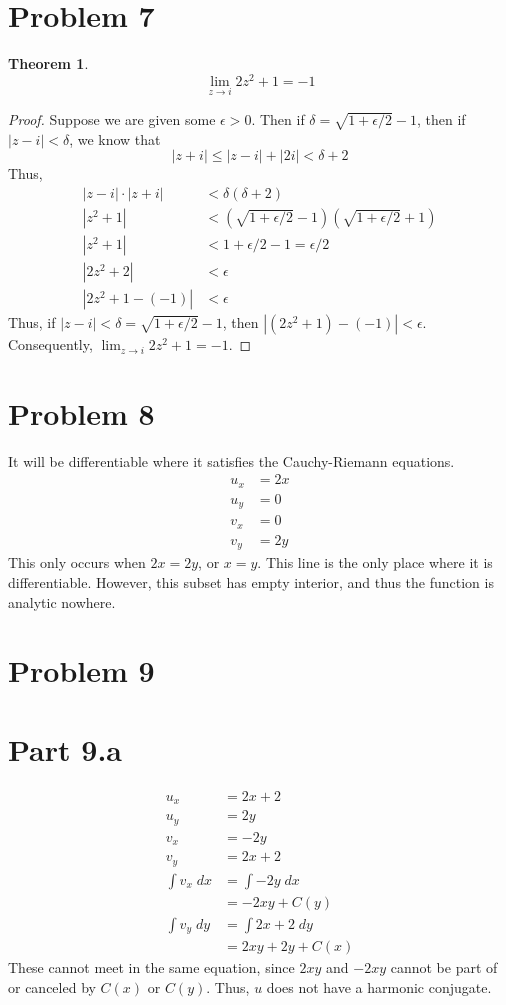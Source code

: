 \documentclass{article}
\newtheorem{theorem}[subsection]{Theorem}
\theoremstyle{definition}
\newcommand{\p}[1]{\left(#1\right)}
\newcommand{\abs}[1]{\left|#1\right|}
\begin{document}
\section{Problem 7}
\begin{theorem}
\[ \lim_{z \to i} 2z^2 + 1 = -1 \]
\end{theorem}
\begin{proof}
Suppose we are given some $\epsilon>0$. Then if 
$\delta=\sqrt{1+\epsilon/2}-1$, then if $\abs{z-i} < \delta$,
we know that 
\[
\abs{z+i}
\le \abs{z-i} + \abs{2i}
< \delta + 2
\]
Thus,
\begin{align*}
\abs{z-i} \cdot \abs{z+i} 
&< \delta(\delta+2) \\
\abs{z^2+1} 
&< \p{\sqrt{1+\epsilon/2}-1}\p{\sqrt{1+\epsilon/2}+1} \\
\abs{z^2+1}
&< 1+\epsilon/2 - 1 = \epsilon/2 \\
\abs{2z^2+2} &< \epsilon \\
\abs{2z^2 + 1 - (-1)} &< \epsilon
\end{align*}
Thus, if $\abs{z-i} < \delta = \sqrt{1+\epsilon/2}-1$, then 
$\abs{(2z^2+1)-(-1)} < \epsilon$. Consequently, $\lim_{z \to i} 2 z^2+1 = -1$.
\end{proof}

\section{Problem 8}
It will be differentiable where it satisfies the Cauchy-Riemann equations.
\begin{align*}
u_x &= 2x \\
u_y &= 0 \\
v_x &= 0 \\
v_y &= 2y 
\end{align*}
This only occurs when $2x=2y$, or $x=y$. This line is the only place
where it is differentiable. However, this subset has empty interior,
and thus the function is analytic nowhere.

\section{Problem 9}
\section{Part 9.a}
\begin{align*}
u_x &= 2x + 2 \\
u_y &= 2y \\
v_x &= -2y \tag{C-R}\\
v_y &= 2x+2 \tag{C-R}\\
\int v_x \;dx 
&= \int -2y \;dx \\
&= -2xy + C(y) \\
\int v_y \;dy 
&= \int 2x+2 \;dy \\
&= 2xy+2y+C(x)
\end{align*}
These cannot meet in the same equation, since $2xy$ and $-2xy$ cannot
be part of or canceled by $C(x)$ or $C(y)$.
Thus, $u$ does not have a harmonic conjugate.
\end{document}
